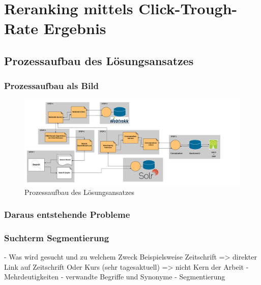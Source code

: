 %
\chapter{Reranking mittels Click-Trough-Rate Ergebnis}
\label{sec:Reranking}


\section{Prozessaufbau des Lösungsansatzes}
\label{sec:Reranking:Prozessaufbau}

\subsection{Prozessaufbau als Bild}
\label{sec:Reranking:Prozessaufbau:ProzessaufbauBild}

\begin{figure}[H]
\centering
\includegraphics[width=0.5\linewidth]{gfx/Prozessaufbau}
\caption[Prozessaufbau des Lösungsansatzes]{Prozessaufbau des Lösungsansatzes}
\label{fig:SucheSpringerNature}
\end{figure}

\subsection{Daraus entstehende Probleme}
\label{sec:Reranking:Prozessaufbau}

\subsection{Suchterm Segmentierung}
\label{sec:Reranking:Prozessaufbau:SuchtermSegmentierung}

- Was wird gesucht und zu welchem Zweck
	Beispielsweise Zeitschrift => direkter Link auf Zeitschrift
	Oder Kurs (sehr tagesaktuell)
	=> nicht Kern der Arbeit
- Mehrdeutigkeiten
- verwandte Begriffe und Synonyme
- Segmentierung

